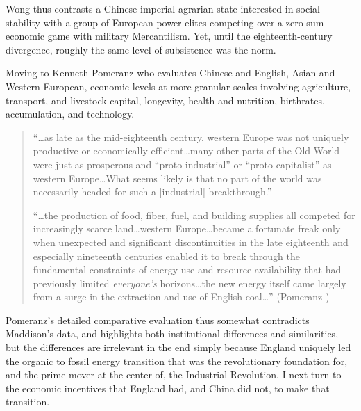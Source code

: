 \documentclass[12pt]{article}
\numberwithin{equation}{section}
\begin{document}
		Wong thus contrasts a Chinese imperial agrarian state interested in social stability with a group of European power elites competing over a zero-sum economic game with military Mercantilism. Yet, until the eighteenth-century divergence, roughly the same level of subsistence was the norm.

		
		Moving to Kenneth Pomeranz who evaluates Chinese and English, Asian and Western European, economic levels at more granular scales involving agriculture, transport, and livestock capital, longevity, health and nutrition, birthrates, accumulation, and technology.
		
		\begin{quotation}
		``\ldots as late as the mid-eighteenth century, western Europe was not uniquely productive or economically efficient\ldots many other parts of the Old World were just as prosperous and ``proto-industrial'' or ``proto-capitalist'' as western Europe\ldots What seems likely is that no part of the world was necessarily headed for such a [industrial] breakthrough.''
		
		``\ldots the production of food, fiber, fuel, and building supplies all competed for increasingly scarce land\ldots western Europe\ldots became a fortunate freak only when unexpected and significant discontinuities in the late eighteenth and especially nineteenth centuries enabled it to break through the fundamental constraints of energy use and resource availability that had previously limited \textit{everyone's} horizons\dots the new energy itself came largely from a surge in the extraction and use of English coal\ldots'' (Pomeranz \citeyear[pp.~206--07]{pomeranz_great_2001})
		\end{quotation} 
		
		Pomeranz's detailed comparative evaluation thus somewhat contradicts Maddison's data, and highlights both institutional differences and similarities, but the differences are irrelevant in the end simply because England uniquely led the organic to fossil energy transition that was the revolutionary foundation for, and the prime mover at the center of, the Industrial Revolution. I next turn to the economic incentives that England had, and China did not, to make that transition.
		
\end{document}
